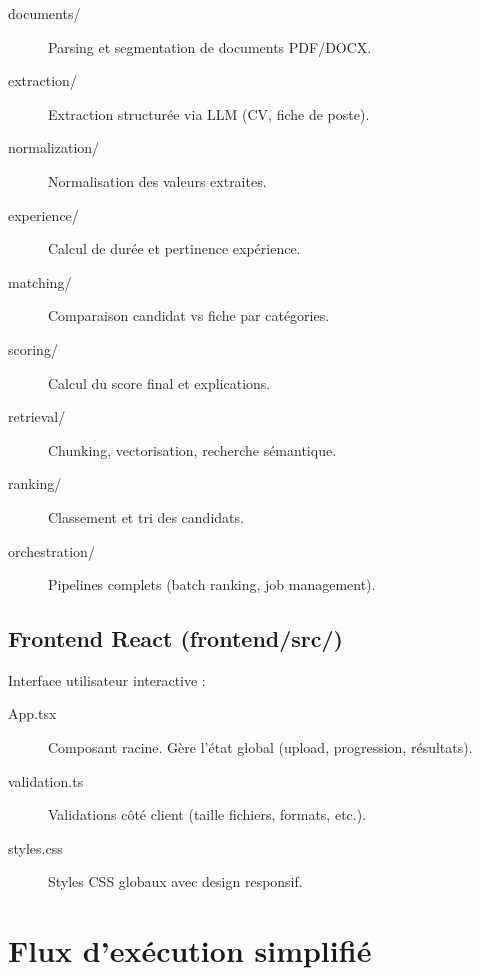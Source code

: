 \documentclass[12pt,a4paper,oneside]{book}
\begin{document}
\begin{description}
    \item[documents/] Parsing et segmentation de documents PDF/DOCX.
    
    \item[extraction/] Extraction structurée via LLM (CV, fiche de poste).
    
    \item[normalization/] Normalisation des valeurs extraites.
    
    \item[experience/] Calcul de durée et pertinence expérience.
    
    \item[matching/] Comparaison candidat vs fiche par catégories.
    
    \item[scoring/] Calcul du score final et explications.
    
    \item[retrieval/] Chunking, vectorisation, recherche sémantique.
    
    \item[ranking/] Classement et tri des candidats.
    
    \item[orchestration/] Pipelines complets (batch ranking, job management).
\end{description}

\subsection{Frontend React (frontend/src/)}

Interface utilisateur interactive :

\begin{description}
    \item[App.tsx] Composant racine. Gère l'état global (upload, progression, résultats).
    
    \item[validation.ts] Validations côté client (taille fichiers, formats, etc.).
    
    \item[styles.css] Styles CSS globaux avec design responsif.
\end{description}

\section{Flux d'exécution simplifié}
\end{document}
